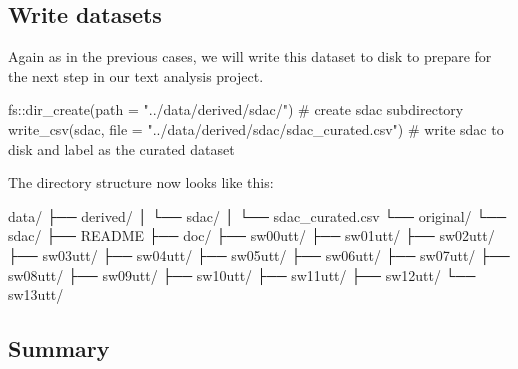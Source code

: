 \documentclass[
  letterpaper,
]{latex/krantz}
\newenvironment{Shaded}{\begin{snugshade}}{\end{snugshade}}
\newcommand{\AttributeTok}[1]{\textcolor[rgb]{0.40,0.45,0.13}{#1}}
\newcommand{\CommentTok}[1]{\textcolor[rgb]{0.37,0.37,0.37}{#1}}
\newcommand{\ExtensionTok}[1]{\textcolor[rgb]{0.00,0.23,0.31}{#1}}
\newcommand{\FunctionTok}[1]{\textcolor[rgb]{0.28,0.35,0.67}{#1}}
\newcommand{\NormalTok}[1]{\textcolor[rgb]{0.00,0.23,0.31}{#1}}
\newcommand{\SpecialCharTok}[1]{\textcolor[rgb]{0.37,0.37,0.37}{#1}}
\newcommand{\StringTok}[1]{\textcolor[rgb]{0.13,0.47,0.30}{#1}}
\begin{document}
\hypertarget{write-datasets}{%
\subsection{Write datasets}\label{write-datasets}}

Again as in the previous cases, we will write this dataset to disk to
prepare for the next step in our text analysis project.

\begin{Shaded}
\begin{Highlighting}[]
\NormalTok{fs}\SpecialCharTok{::}\FunctionTok{dir\_create}\NormalTok{(}\AttributeTok{path =} \StringTok{"../data/derived/sdac/"}\NormalTok{) }\CommentTok{\# create sdac subdirectory}
\FunctionTok{write\_csv}\NormalTok{(sdac, }
          \AttributeTok{file =} \StringTok{"../data/derived/sdac/sdac\_curated.csv"}\NormalTok{) }\CommentTok{\# write sdac to disk and label as the curated dataset}
\end{Highlighting}
\end{Shaded}

The directory structure now looks like this:

\begin{Shaded}
\begin{Highlighting}[]
\ExtensionTok{data/}
\ExtensionTok{├──}\NormalTok{ derived/}
\ExtensionTok{│}\NormalTok{   └── sdac/}
\ExtensionTok{│}\NormalTok{       └── sdac\_curated.csv}
\ExtensionTok{└──}\NormalTok{ original/}
    \ExtensionTok{└──}\NormalTok{ sdac/}
        \ExtensionTok{├──}\NormalTok{ README}
        \ExtensionTok{├──}\NormalTok{ doc/}
        \ExtensionTok{├──}\NormalTok{ sw00utt/}
        \ExtensionTok{├──}\NormalTok{ sw01utt/}
        \ExtensionTok{├──}\NormalTok{ sw02utt/}
        \ExtensionTok{├──}\NormalTok{ sw03utt/}
        \ExtensionTok{├──}\NormalTok{ sw04utt/}
        \ExtensionTok{├──}\NormalTok{ sw05utt/}
        \ExtensionTok{├──}\NormalTok{ sw06utt/}
        \ExtensionTok{├──}\NormalTok{ sw07utt/}
        \ExtensionTok{├──}\NormalTok{ sw08utt/}
        \ExtensionTok{├──}\NormalTok{ sw09utt/}
        \ExtensionTok{├──}\NormalTok{ sw10utt/}
        \ExtensionTok{├──}\NormalTok{ sw11utt/}
        \ExtensionTok{├──}\NormalTok{ sw12utt/}
        \ExtensionTok{└──}\NormalTok{ sw13utt/}
\end{Highlighting}
\end{Shaded}

\hypertarget{summary-8}{%
\subsection{Summary}\label{summary-8}}
\end{document}
